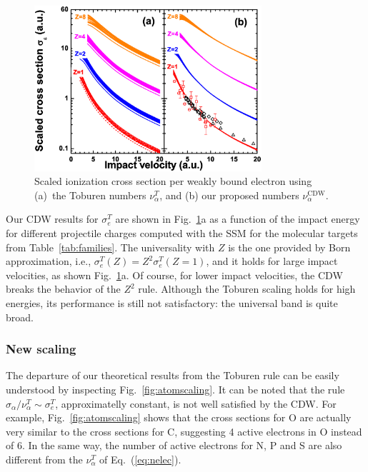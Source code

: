 \documentclass[preprint,12pt]{article}
\begin{document}
\begin{figure}[t!]
\centering
\includegraphics[width=0.75\textwidth]{figuras/Fig_finales/Fig4.eps}
\caption{Scaled ionization cross section per weakly bound electron using
(a)~the Toburen numbers $\nu_{\alpha}^T$, and (b) our proposed numbers
$\nu_{\alpha}^{\text{CDW}}$.}
\label{fig:newscaling}
\end{figure}

Our CDW results for $\sigma_{e}^T$ are shown in 
Fig.~\ref{fig:newscaling}a as a function of 
the impact energy for different projectile charges computed with the 
SSM for the molecular targets from Table~\ref{tab:families}. 
The universality with $Z$ is the one provided 
by Born approximation, i.e., $\sigma_{e}^T(Z)=Z^{2}\sigma_{e}^T(Z=1)$, 
and it holds for large impact velocities, as shown 
Fig.~\ref{fig:newscaling}a.
Of course, for lower impact velocities, the CDW breaks the behavior of 
the $Z^{2}$ rule. Although the Toburen scaling holds for high energies, 
its performance is still not satisfactory: the universal band is quite 
broad. 

\subsubsection{New scaling}

The departure of our theoretical 
results from the Toburen rule can be easily understood %
by inspecting Fig.~\ref{fig:atomscaling}. It can be noted that the 
rule $\sigma_{\alpha}/\nu_{\alpha}^T\sim \sigma_{e}^T$, approximatelly 
constant, is not well satisfied by the CDW. 
For example, Fig.~\ref{fig:atomscaling} shows that the cross sections
for O are actually very similar to the cross sections for C, suggesting 
4 active electrons in O instead of 6. In the same way, the number of
active electrons for N, P and S are also different from the 
$\nu_{\alpha}^T$ of Eq.~(\ref{eq:nelec}). 
\end{document}
